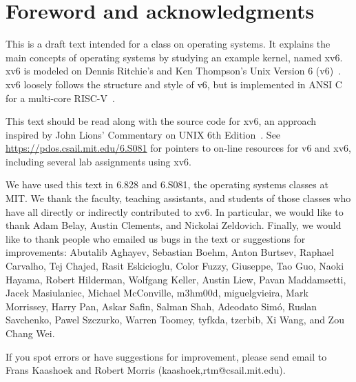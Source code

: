 \chapter*{Foreword and acknowledgments}


This is a draft text intended for a class on operating systems. It
explains the main concepts of operating systems by studying an example
kernel, named xv6.  xv6 is modeled on Dennis Ritchie's and
Ken Thompson's Unix Version 6 (v6)~\cite{unix}.  xv6 loosely follows the structure
and style of v6, but is implemented in ANSI C~\cite{kernighan} for 
a multi-core RISC-V~\cite{riscv}.

This text should be read along with the source code for xv6, an approach 
inspired by John Lions' Commentary on UNIX 6th Edition~\cite{lions}. See
\url{https://pdos.csail.mit.edu/6.S081} for pointers to on-line
resources for v6 and xv6, including several lab assignments
using xv6.

We have used this text in 6.828 and 6.S081, the operating systems
classes at MIT.  We thank the faculty, teaching assistants, and
students of those classes who have all directly or indirectly
contributed to xv6.  In particular, we would like to thank Adam Belay,
Austin Clements, and Nickolai Zeldovich.  Finally, we would like to
thank people who emailed us bugs in the text or suggestions for
improvements: Abutalib Aghayev, Sebastian Boehm, Anton Burtsev,
Raphael Carvalho, Tej Chajed, Rasit Eskicioglu, Color Fuzzy, Giuseppe,
Tao Guo, Naoki Hayama, Robert Hilderman, Wolfgang Keller, Austin Liew,
Pavan Maddamsetti, Jacek Masiulaniec, Michael McConville, m3hm00d,
miguelgvieira, Mark Morrissey, Harry Pan, Askar Safin, Salman Shah,
Adeodato Simó, Ruslan Savchenko, Pawel Szczurko, Warren Toomey,
tyfkda, tzerbib, Xi Wang, and Zou Chang Wei.

If you spot errors or have suggestions for improvement, please send email to
Frans Kaashoek and Robert Morris (kaashoek,rtm@csail.mit.edu).
